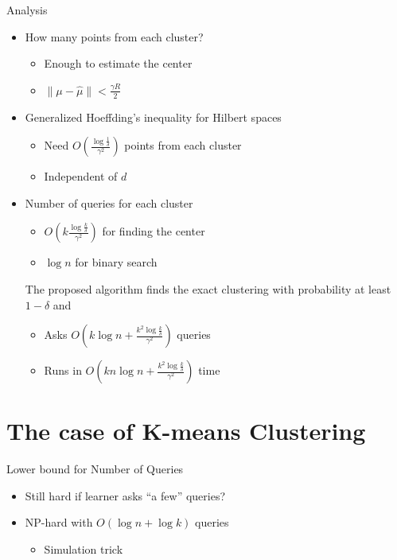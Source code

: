 \documentclass{beamer}
\begin{document}
\begin{frame}{Analysis}
  \begin{itemize}
    
    \item How many points from each cluster?
    \begin{itemize}
        \item Enough to estimate the center
        \item $\|\mu - \hat{\mu}\| < \frac{\gamma R}{2}$

    \end{itemize}
    \pause
    
    \item Generalized Hoeffding's inequality for Hilbert spaces
    \begin{itemize}
        \item Need $O(\frac{\log \frac{1}{\delta}}{\gamma ^2})$ points from each cluster
        \item Independent of $d$
    \end{itemize}    
    \pause
    \item Number of queries for each cluster
    \begin{itemize}
        \item $O(k\frac{\log \frac{k}{\delta}}{\gamma ^2})$ for finding the center
        \item $\log n$ for binary search
    \end{itemize}        
    \pause
    \begin{theorem}
        The proposed algorithm finds the exact clustering with probability at least $1-\delta$ and
        \begin{itemize}
            \item Asks $O(k \log n  + \frac{k^2 \log \frac{k}{\delta}}{\gamma ^2})$ queries
            \item Runs in $O(kn \log n  + \frac{k^2 \log \frac{k}{\delta}}{\gamma ^2})$ time       
            \end{itemize}   
    \end{theorem}


  \end{itemize}
\end{frame}


\section{The case of K-means Clustering}

\begin{frame}{Lower bound for Number of Queries}
  \begin{itemize}
    
    \item Still hard if learner asks ``a few'' queries?
    \pause
    \item NP-hard with $O(\log n + \log k)$ queries
    \begin{itemize}
        \item Simulation trick
    \end{itemize}
    
  \end{itemize}
\end{frame}
\end{document}
